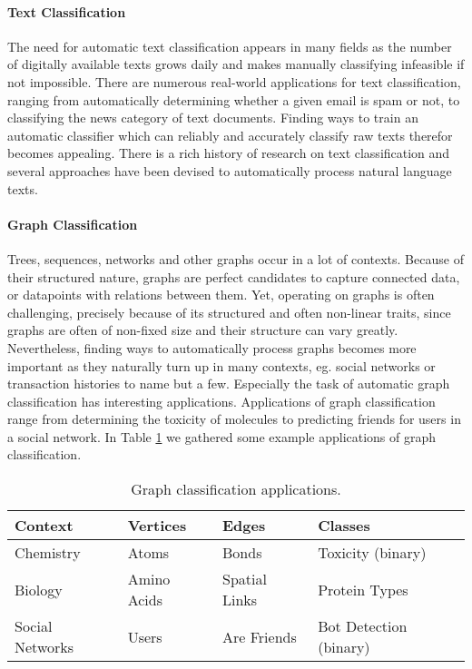 
\paragraph{Text Classification}
The need for automatic text classification appears in many fields as the number of digitally available texts grows daily and makes manually classifying infeasible if not impossible.
There are numerous real-world applications for text classification, ranging from automatically determining whether a given email is spam or not, to classifying the news category of text documents.
Finding ways to train an automatic classifier which can reliably and accurately classify raw texts therefor becomes appealing.
There is a rich history of research on text classification and several approaches have been devised to automatically process natural language texts.

\paragraph{Graph Classification}
Trees, sequences, networks and other graphs occur in a lot of contexts.
Because of their structured nature, graphs are perfect candidates to capture connected data, or datapoints with relations between them.
Yet, operating on graphs is often challenging, precisely because of its structured and often non-linear traits, since graphs are often of non-fixed size and their structure can vary greatly.
Nevertheless, finding ways to automatically process graphs becomes more important as they naturally turn up in many contexts, eg. social networks or transaction histories to name but a few.
Especially the task of automatic graph classification has interesting applications.
Applications of graph classification range from determining the toxicity of molecules to predicting friends for users in a social network.
In Table \ref{table:graph_classification_examples} we gathered some example applications of graph classification.

\begin{table}[htb!]
\centering
\renewcommand*{\arraystretch}{0.95}
\begin{tabular}{llll}
Context & Vertices & Edges & Classes \\
\midrule
Chemistry & Atoms & Bonds & Toxicity (binary) \\
Biology & Amino Acids & Spatial Links & Protein Types \\ 
Social Networks & Users & Are Friends & Bot Detection (binary) \\
\bottomrule
\end{tabular}%
\caption[Table: Graph Classification Applications]{Graph classification applications.}%
\label{table:graph_classification_examples}
\end{table}

